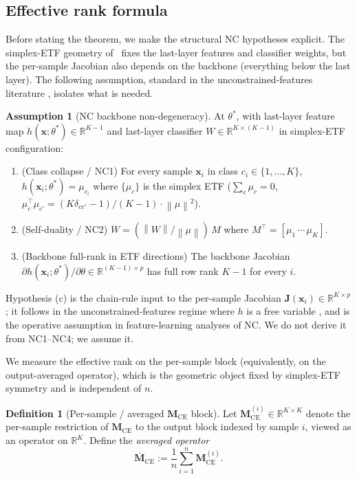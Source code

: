 \documentclass[12pt]{amsart}
\theoremstyle{definition}
\newtheorem{definition}[theorem]{Definition}
\newtheorem{assumption}[theorem]{Assumption}
\theoremstyle{remark}
\newcommand{\R}{\mathbb{R}}
\newcommand{\bx}{\mathbf{x}}
\newcommand{\bJ}{\mathbf{J}}
\newcommand{\bM}{\mathbf{M}}
\newcommand{\norm}[1]{\left\lVert #1 \right\rVert}
\begin{document}
\subsection{Effective rank formula}

Before stating the theorem, we make the structural NC hypotheses
explicit. The simplex-ETF geometry of~\cite{papyan2020} fixes the
last-layer features and classifier weights, but the per-sample
Jacobian also depends on the backbone (everything below the last
layer). The following assumption, standard in the
unconstrained-features literature
\cite{lu2022,mixon2022,Fang2021}, isolates what is needed.

\begin{assumption}[NC backbone non-degeneracy]\label{ass:nc-backbone}
At $\theta^{*}$, with last-layer feature map
$h(\bx;\theta^{*}) \in \R^{K-1}$ and last-layer classifier
$W \in \R^{K\times(K-1)}$ in simplex-ETF configuration:
\begin{enumerate}[label=(\alph*)]
\item (Class collapse / NC1) For every sample $\bx_{i}$ in class
$c_{i} \in \{1,\ldots,K\}$, $h(\bx_{i};\theta^{*}) = \mu_{c_{i}}$
where $\{\mu_{c}\}$ is the simplex ETF
($\sum_{c}\mu_{c} = 0$,
$\mu_{c}^{\top}\mu_{c'} = (K\delta_{cc'} - 1)/(K-1) \cdot \norm{\mu}^{2}$).
\item (Self-duality / NC2) $W = (\norm{W}/\norm{\mu})\,M$ where
$M^{\top} = [\mu_{1}\,\cdots\,\mu_{K}]$.
\item (Backbone full-rank in ETF directions) The backbone Jacobian
$\partial h(\bx_{i};\theta^{*})/\partial\theta \in \R^{(K-1) \times p}$
has full row rank $K-1$ for every $i$.
\end{enumerate}
\end{assumption}

Hypothesis (c) is the chain-rule input to the per-sample Jacobian
$\bJ(\bx_{i}) \in \R^{K\times p}$; it follows in the
unconstrained-features regime where $h$ is a free variable
\cite{mixon2022}, and is the operative assumption in feature-learning
analyses of NC. We do not derive it from NC1--NC4; we assume it.

We measure the effective rank on the per-sample block (equivalently,
on the output-averaged operator), which is the geometric object
fixed by simplex-ETF symmetry and is independent of $n$.

\begin{definition}[Per-sample / averaged $\bM_{\mathrm{CE}}$ block]\label{def:M-bar}
Let $\bM_{\mathrm{CE}}^{(i)} \in \R^{K\times K}$ denote the
per-sample restriction of $\bM_{\mathrm{CE}}$ to the output block
indexed by sample $i$, viewed as an operator on $\R^{K}$. Define
the \emph{averaged operator}
\[
  \overline{\bM}_{\mathrm{CE}}
  := \frac{1}{n}\sum_{i=1}^{n}\bM_{\mathrm{CE}}^{(i)}.
\]
\end{definition}
\end{document}
